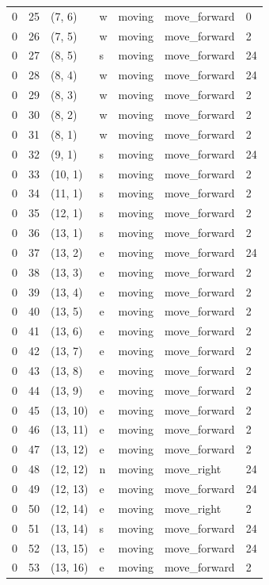 \begin{table}[H]
\begin{tabular}{lllllll}
0 & 25 & (7, 6) & w & moving & move\_forward & 0 \\
0 & 26 & (7, 5) & w & moving & move\_forward & 2 \\
0 & 27 & (8, 5) & s & moving & move\_forward & 24 \\
0 & 28 & (8, 4) & w & moving & move\_forward & 24 \\
0 & 29 & (8, 3) & w & moving & move\_forward & 2 \\
0 & 30 & (8, 2) & w & moving & move\_forward & 2 \\
0 & 31 & (8, 1) & w & moving & move\_forward & 2 \\
0 & 32 & (9, 1) & s & moving & move\_forward & 24 \\
0 & 33 & (10, 1) & s & moving & move\_forward & 2 \\
0 & 34 & (11, 1) & s & moving & move\_forward & 2 \\
0 & 35 & (12, 1) & s & moving & move\_forward & 2 \\
0 & 36 & (13, 1) & s & moving & move\_forward & 2 \\
0 & 37 & (13, 2) & e & moving & move\_forward & 24 \\
0 & 38 & (13, 3) & e & moving & move\_forward & 2 \\
0 & 39 & (13, 4) & e & moving & move\_forward & 2 \\
0 & 40 & (13, 5) & e & moving & move\_forward & 2 \\
0 & 41 & (13, 6) & e & moving & move\_forward & 2 \\
0 & 42 & (13, 7) & e & moving & move\_forward & 2 \\
0 & 43 & (13, 8) & e & moving & move\_forward & 2 \\
0 & 44 & (13, 9) & e & moving & move\_forward & 2 \\
0 & 45 & (13, 10) & e & moving & move\_forward & 2 \\
0 & 46 & (13, 11) & e & moving & move\_forward & 2 \\
0 & 47 & (13, 12) & e & moving & move\_forward & 2 \\
0 & 48 & (12, 12) & n & moving & move\_right & 24 \\
0 & 49 & (12, 13) & e & moving & move\_forward & 24 \\
0 & 50 & (12, 14) & e & moving & move\_right & 2 \\
0 & 51 & (13, 14) & s & moving & move\_forward & 24 \\
0 & 52 & (13, 15) & e & moving & move\_forward & 24 \\
0 & 53 & (13, 16) & e & moving & move\_forward & 2 \\
    \bottomrule
  \end{tabular}
\end{table}

